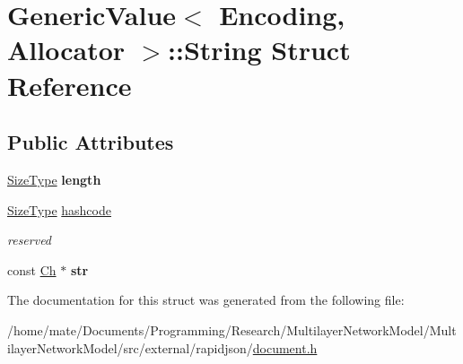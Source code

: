 \hypertarget{structGenericValue_1_1String}{}\section{Generic\+Value$<$ Encoding, Allocator $>$\+:\+:String Struct Reference}
\label{structGenericValue_1_1String}
\subsection*{Public Attributes}
\begin{DoxyCompactItemize}
\item 
\hyperlink{rapidjson_8h_a5ed6e6e67250fadbd041127e6386dcb5}{Size\+Type} {\bfseries length}\hypertarget{structGenericValue_1_1String_ad6ffab0e093aa8db6e415812ff6443bf}{}\label{structGenericValue_1_1String_ad6ffab0e093aa8db6e415812ff6443bf}

\item 
\hyperlink{rapidjson_8h_a5ed6e6e67250fadbd041127e6386dcb5}{Size\+Type} \hyperlink{structGenericValue_1_1String_a73631052aeb72fbabb6eaab0175f858e}{hashcode}\hypertarget{structGenericValue_1_1String_a73631052aeb72fbabb6eaab0175f858e}{}\label{structGenericValue_1_1String_a73631052aeb72fbabb6eaab0175f858e}

\begin{DoxyCompactList}\small\item\em reserved \end{DoxyCompactList}\item 
const \hyperlink{classGenericValue_ade0e0ce64ccd5d852da57a35e720bafb}{Ch} $\ast$ {\bfseries str}\hypertarget{structGenericValue_1_1String_a4eebc5acf3f93ab833efd82abf3ba84d}{}\label{structGenericValue_1_1String_a4eebc5acf3f93ab833efd82abf3ba84d}

\end{DoxyCompactItemize}


The documentation for this struct was generated from the following file\+:\begin{DoxyCompactItemize}
\item 
/home/mate/\+Documents/\+Programming/\+Research/\+Multilayer\+Network\+Model/\+Multilayer\+Network\+Model/src/external/rapidjson/\hyperlink{document_8h}{document.\+h}\end{DoxyCompactItemize}
